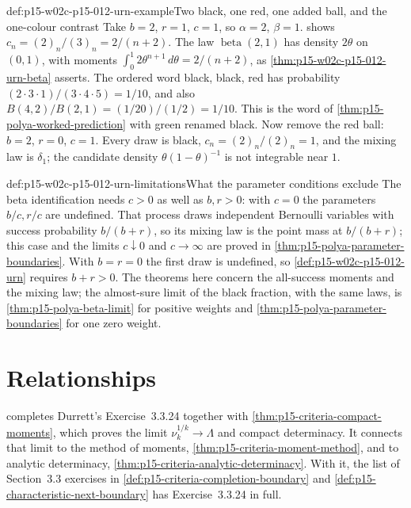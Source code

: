 \begin{hbexample}{def:p15-w02c-p15-012-urn-example}{Two black, one red, one added ball, and the one-colour contrast}
Take \(b=2\), \(r=1\), \(c=1\), so \(\alpha=2\), \(\beta=1\).
 shows
\(c_n=(2)_n/(3)_n=2/(n+2)\). The law \(\operatorname{beta}(2,1)\) has
density \(2\theta\) on \((0,1)\), with moments
\(\int_0^1 2\theta^{n+1}\,d\theta=2/(n+2)\), as
\cref{thm:p15-w02c-p15-012-urn-beta} asserts.
The ordered word black, black, red has probability
\((2\cdot3\cdot1)/(3\cdot4\cdot5)=1/10\), and also
\(B(4,2)/B(2,1)=(1/20)/(1/2)=1/10\).
This is the word of \cref{thm:p15-polya-worked-prediction} with green
renamed black.
Now remove the red ball: \(b=2\), \(r=0\), \(c=1\). Every draw is black,
\(c_n=(2)_n/(2)_n=1\), and the mixing law is \(\delta_1\); the candidate
density \(\theta(1-\theta)^{-1}\) is not integrable near \(1\).
\end{hbexample}

\begin{hbwarning}{def:p15-w02c-p15-012-urn-limitations}{What the parameter conditions exclude}
The beta identification needs \(c>0\) as well as \(b,r>0\): with \(c=0\)
the parameters \(b/c,r/c\) are undefined. That process draws independent
Bernoulli variables with success probability \(b/(b+r)\), so its mixing
law is the point mass at \(b/(b+r)\); this case and the limits
\(c\downarrow0\) and \(c\to\infty\) are proved in
\cref{thm:p15-polya-parameter-boundaries}. With \(b=r=0\) the first draw
is undefined, so \cref{def:p15-w02c-p15-012-urn} requires \(b+r>0\).
The theorems here concern the all-success moments and the mixing law;
the almost-sure limit of the black fraction, with the same laws, is
\cref{thm:p15-polya-beta-limit} for positive weights and
\cref{thm:p15-polya-parameter-boundaries} for one zero weight.
\end{hbwarning}

\section{Relationships}
\label{sec:p15-w02c-p15-012-relationships}

 completes Durrett's
Exercise~3.3.24 together with \cref{thm:p15-criteria-compact-moments},
which proves the limit \(\nu_k^{1/k}\to\Lambda\) and compact determinacy.
It connects that limit to the method of moments,
\cref{thm:p15-criteria-moment-method}, and to analytic determinacy,
\cref{thm:p15-criteria-analytic-determinacy}. With it, the list of
Section~3.3 exercises in \cref{def:p15-criteria-completion-boundary} and
\cref{def:p15-characteristic-next-boundary} has Exercise~3.3.24 in full.

